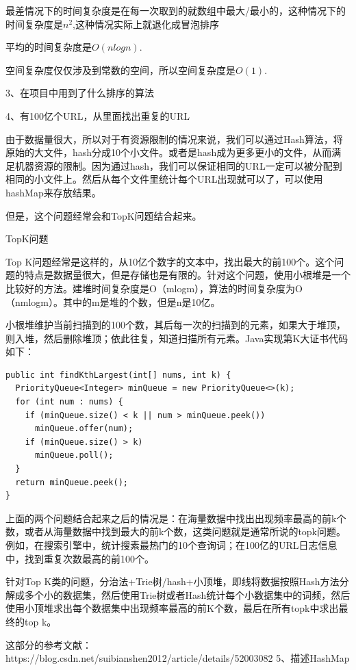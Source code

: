\documentclass[UTF8]{ctexart}
\begin{document}
最差情况下的时间复杂度是在每一次取到的就数组中最大/最小的，这种情况下的时间复杂度是$n^2$,这种情况实际上就退化成冒泡排序

平均的时间复杂度是$O(nlogn)$.

空间复杂度仅仅涉及到常数的空间，所以空间复杂度是$O(1)$.

3、在项目中用到了什么排序的算法

4、有100亿个URL，从里面找出重复的URL

由于数据量很大，所以对于有资源限制的情况来说，我们可以通过Hash算法，将原始的大文件，hash分成10个小文件。或者是hash成为更多更小的文件，从而满足机器资源的限制。因为通过hash，我们可以保证相同的URL一定可以被分配到相同的小文件上。然后从每个文件里统计每个URL出现就可以了，可以使用hashMap来存放结果。

但是，这个问题经常会和TopK问题结合起来。

TopK问题

Top K问题经常是这样的，从10亿个数字的文本中，找出最大的前100个。这个问题的特点是数据量很大，但是存储也是有限的。针对这个问题，使用小根堆是一个比较好的方法。建堆时间复杂度是O（mlogm），算法的时间复杂度为O（nmlogm）。其中的m是堆的个数，但是n是10亿。

小根堆维护当前扫描到的100个数，其后每一次的扫描到的元素，如果大于堆顶，则入堆，然后删除堆顶；依此往复，知道扫描所有元素。Java实现第K大证书代码如下：
\begin{lstlisting}
public int findKthLargest(int[] nums, int k) {
  PriorityQueue<Integer> minQueue = new PriorityQueue<>(k);
  for (int num : nums) {
    if (minQueue.size() < k || num > minQueue.peek())
      minQueue.offer(num);
    if (minQueue.size() > k)
      minQueue.poll();
  }
  return minQueue.peek();
}
\end{lstlisting}


上面的两个问题结合起来之后的情况是：在海量数据中找出出现频率最高的前k个数，或者从海量数据中找到最大的前k个数，这类问题就是通常所说的topk问题。例如，在搜索引擎中，统计搜素最热门的10个查询词；在100亿的URL日志信息中，找到重复次数最高的前100个。

针对Top K类的问题，分治法+Trie树/hash+小顶堆，即线将数据按照Hash方法分解成多个小的数据集，然后使用Trie树或者Hash统计每个小数据集中的词频，然后使用小顶堆求出每个数据集中出现频率最高的前K个数，最后在所有topk中求出最终的top k。

这部分的参考文献：https://blog.csdn.net/suibianshen2012/article/details/52003082
5、描述HashMap 
\end{document}
